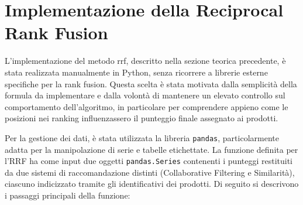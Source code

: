 \section{Implementazione della Reciprocal Rank Fusion}

L'implementazione del metodo \gls{rrf}, descritto nella sezione teorica precedente, è stata realizzata manualmente in Python, senza ricorrere a librerie esterne specifiche per la rank fusion. Questa scelta è stata motivata dalla semplicità della formula da implementare e dalla volontà di mantenere un elevato controllo sul comportamento dell'algoritmo, in particolare per comprendere appieno come le posizioni nei ranking influenzassero il punteggio finale assegnato ai prodotti.

Per la gestione dei dati, è stata utilizzata la libreria \texttt{pandas}, particolarmente adatta per la manipolazione di serie e tabelle etichettate. La funzione definita per l'RRF ha come input due oggetti \texttt{pandas.Series} contenenti i punteggi restituiti da due sistemi di raccomandazione distinti (Collaborative Filtering e Similarità), ciascuno indicizzato tramite gli identificativi dei prodotti. Di seguito si descrivono i passaggi principali della funzione:

